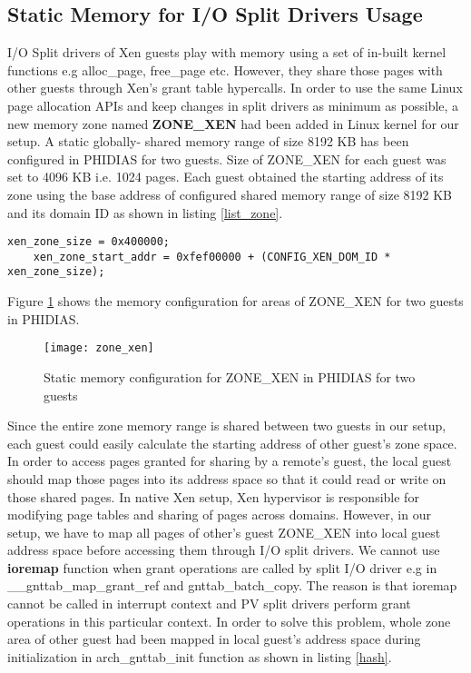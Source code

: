\subsection{Static Memory for I/O Split Drivers Usage\label{sec:splitdriverusage}}
I/O Split drivers of Xen guests play with memory using a set of in-built kernel functions e.g alloc\_page, free\_page etc. However, they share those pages with other guests through Xen's grant table hypercalls. In order to use the same Linux page allocation APIs and keep changes in split drivers as minimum as possible, a new memory zone named \textbf{ZONE\_XEN} had been added in Linux kernel for our setup. A static globally- shared memory range of size 8192 KB has been configured in PHIDIAS for two guests. Size of ZONE\_XEN for each guest was set to 4096 KB i.e. 1024 pages. Each guest obtained the starting address of its zone using the base address of configured shared memory range of size 8192 KB and its domain ID as shown in listing  \ref{list_zone}.
\\
\begin{lstlisting}[caption=Code snippet for calculating start address of guest ZONE\_XEN, label={list_zone}]
    xen_zone_size = 0x400000;
    xen_zone_start_addr = 0xfef00000 + (CONFIG_XEN_DOM_ID * xen_zone_size);

\end{lstlisting}
Figure \ref{zone_xen} shows the memory configuration for areas of ZONE\_XEN for two guests in PHIDIAS.
\begin{figure}[!htbp]
	\centering
	\texttt{[image: zone\_xen]}
	\caption{Static memory configuration for ZONE\_XEN in PHIDIAS for two guests}
	\label{zone_xen}
\end{figure}
Since the entire zone memory range is shared between two guests in our setup, each guest could easily calculate the starting address of other guest's zone space. In order to access pages granted for sharing by a remote's guest, the local guest should map those pages into its address space so that it could read or write on those shared pages. In native Xen setup, Xen hypervisor is responsible for modifying page tables and sharing of pages across domains. However, in our setup, we have to map all pages of other's guest ZONE\_XEN into local guest address space before accessing them through I/O split drivers. We cannot use \textbf{ioremap} function when grant operations are called by split I/O driver e.g in \_\_gnttab\_map\_grant\_ref and gnttab\_batch\_copy. The reason is that ioremap cannot be called in interrupt context and PV split drivers perform grant operations in this particular context. In order to solve this problem, whole zone area of other guest had been mapped in local guest's address space during initialization in arch\_gnttab\_init function as shown in listing \ref{hash}.\\

